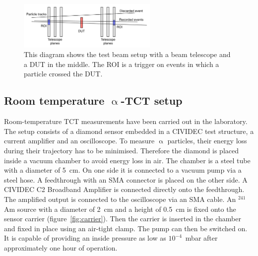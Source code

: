\begin{figure}[!t]
\begin{center}
\includegraphics[width=0.6\textwidth]{03_measurement_results/plots/beamtel}
\caption{This diagram shows the test beam setup with a beam telescope and a DUT in the middle. The ROI is a trigger on events in which a particle crossed the DUT.}
\label{fig:beamtel}
\end{center}
\end{figure}


\subsection{Room temperature $\upalpha$-TCT setup}
Room-temperature TCT measurements have been carried out in the laboratory. The setup consists of a diamond sensor embedded in a CIVIDEC test structure, a current amplifier and an oscilloscope. To measure $\upalpha$ particles, their energy loss during their trajectory has to be minimised. Therefore the diamond is placed inside a vacuum chamber to avoid energy loss in air. The chamber is a steel tube with a diameter of 5~cm. On one side it is connected to a vacuum pump via a steel hose. A feedthrough with an SMA connector is placed on the other side. A CIVIDEC C2 Broadband Amplifier is connected directly onto the feedthrough. The amplified output is connected to the oscilloscope via an SMA cable. An $^{241}$Am source with a diameter of 2~cm and a height of 0.5~cm is fixed onto the sensor carrier (figure~\ref{fig:carrier}). Then the carrier is inserted in the chamber and fixed in place using an air-tight clamp. The pump can then be switched on. It is capable of providing an inside pressure as low as $10^{-4}$~mbar after approximately one hour of operation.

